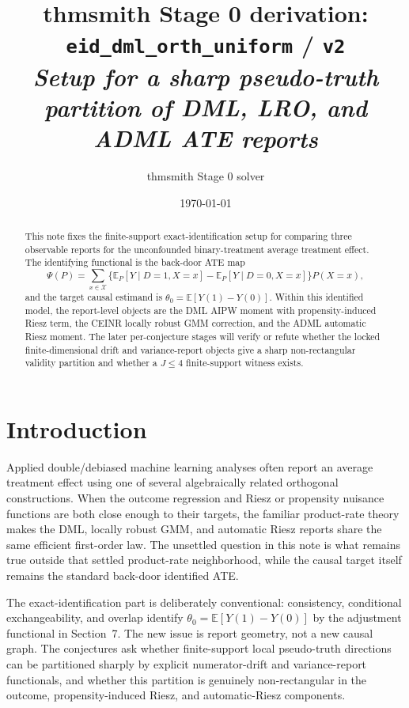 \documentclass[11pt]{article}
\title{thmsmith Stage 0 derivation: \texttt{eid\_dml\_orth\_uniform} / \texttt{v2}%
  \\ \large\textit{Setup for a sharp pseudo-truth partition of DML, LRO, and ADML ATE reports}}
\author{thmsmith Stage 0 solver}
\date{\today}
\newcommand{\E}{\mathbb{E}}
\theoremstyle{definition}
\theoremstyle{plain}
\theoremstyle{remark}
\begin{document}
\maketitle


\begin{abstract}
This note fixes the finite-support exact-identification setup for comparing three observable reports for the unconfounded binary-treatment average treatment effect.  The identifying functional is the back-door ATE map
\[
\Psi(P)=\sum_{x\in\mathcal X}\{\E_P[Y\mid D=1,X=x]-\E_P[Y\mid D=0,X=x]\}P(X=x),
\]
and the target causal estimand is \(\theta_0=\E[Y(1)-Y(0)]\).  Within this identified model, the report-level objects are the DML AIPW moment with propensity-induced Riesz term, the CEINR locally robust GMM correction, and the ADML automatic Riesz moment.  The later per-conjecture stages will verify or refute whether the locked finite-dimensional drift and variance-report objects give a sharp non-rectangular validity partition and whether a \(J\le4\) finite-support witness exists.
\end{abstract}

\section{Introduction}
Applied double/debiased machine learning analyses often report an average treatment effect using one of several algebraically related orthogonal constructions.  When the outcome regression and Riesz or propensity nuisance functions are both close enough to their targets, the familiar product-rate theory makes the DML, locally robust GMM, and automatic Riesz reports share the same efficient first-order law.  The unsettled question in this note is what remains true outside that settled product-rate neighborhood, while the causal target itself remains the standard back-door identified ATE.

The exact-identification part is deliberately conventional: consistency, conditional exchangeability, and overlap identify \(\theta_0=\E[Y(1)-Y(0)]\) by the adjustment functional in Section~7.  The new issue is report geometry, not a new causal graph.  The conjectures ask whether finite-support local pseudo-truth directions can be partitioned sharply by explicit numerator-drift and variance-report functionals, and whether this partition is genuinely non-rectangular in the outcome, propensity-induced Riesz, and automatic-Riesz components.
\end{document}
